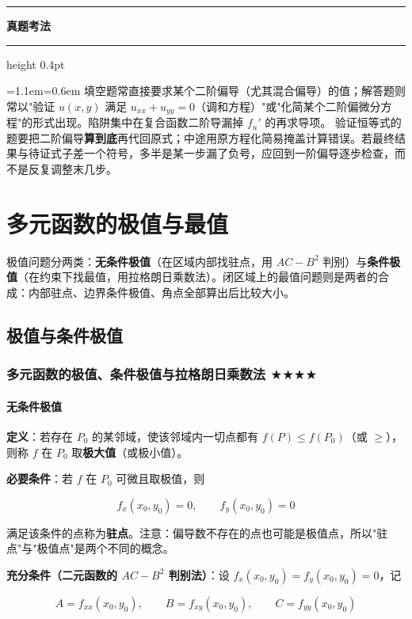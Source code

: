 \documentclass[11pt,openany,UTF8]{ctexbook}
\newcommand{\callouthead}[2]{%
  \par\addvspace{7pt}\noindent
  {\color{#1}\rule[-0.15em]{3pt}{1.05em}}\hspace{0.5em}%
  {\bfseries\color{#1}#2}\par\nobreak\vspace{-0.35em}%
  {\color{rulesep}\hrule height 0.4pt}\nobreak\vspace{0.45em}%
  \begingroup\small\setlength{\parindent}{0pt}%
  \leftskip=1.1em\rightskip=0.6em\noindent\ignorespaces}
\newcommand{\calloutend}{\par\endgroup\addvspace{7pt}}
\newenvironment{callexam}[1]{\callouthead{exambar}{#1}}{\calloutend}
\begin{document}
\begin{callexam}{真题考法}
填空题常直接要求某个二阶偏导（尤其混合偏导）的值；解答题则常以"验证 $u(x,y)$ 满足 $u_{xx}+u_{yy}=0$（调和方程）"或"化简某个二阶偏微分方程"的形式出现。陷阱集中在复合函数二阶导漏掉 $f_u'$ 的再求导项。 验证恒等式的题要把二阶偏导\textbf{算到底}再代回原式；中途用原方程化简易掩盖计算错误。若最终结果与待证式子差一个符号，多半是某一步漏了负号，应回到一阶偏导逐步检查，而不是反复调整末几步。

\end{callexam}

\section{多元函数的极值与最值}

极值问题分两类：\textbf{无条件极值}（在区域内部找驻点，用 $AC-B^{2}$ 判别）与\textbf{条件极值}（在约束下找最值，用拉格朗日乘数法）。闭区域上的最值问题则是两者的合成：内部驻点、边界条件极值、角点全部算出后比较大小。

\subsection{极值与条件极值}

\subsubsection{多元函数的极值、条件极值与拉格朗日乘数法 $\bigstar$$\bigstar$$\bigstar$$\bigstar$}

\paragraph{无条件极值}\mbox{}{\par}

\textbf{定义}：若存在 $P_0$ 的某邻域，使该邻域内一切点都有 $f(P)\le f(P_0)$（或 $\ge$），则称 $f$ 在 $P_0$ 取\textbf{极大值}（或极小值）。

\textbf{必要条件}：若 $f$ 在 $P_0$ 可微且取极值，则

\[f_x(x_0,y_0)=0,\qquad f_y(x_0,y_0)=0\]

满足该条件的点称为\textbf{驻点}。注意：偏导数不存在的点也可能是极值点，所以"驻点"与"极值点"是两个不同的概念。

\textbf{充分条件（二元函数的 $AC-B^{2}$ 判别法）}：设 $f_x(x_0,y_0)=f_y(x_0,y_0)=0$，记

\[A=f_{xx}(x_0,y_0),\qquad B=f_{xy}(x_0,y_0),\qquad C=f_{yy}(x_0,y_0)\]
\end{document}
